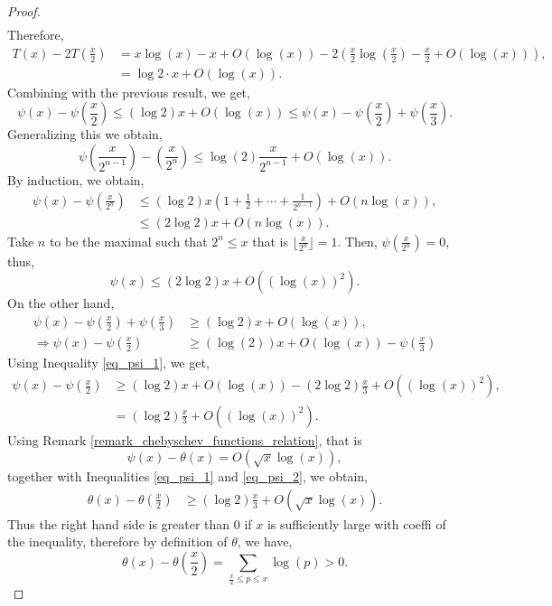 \documentclass{article}
\begin{document}
\begin{proof}
\begin{align*}
  \end{align*}
  Therefore, 
  \begin{align*}
    T(x) - 2T\left({\frac x 2}\right) & = x\log(x)-x+O(\log(x))-2\left({\frac x 2}\log\left({\frac x 2}\right)-{\frac x 2}+O(\log(x))\right),\\
    & = \log2\cdot x + O(\log(x)).
  \end{align*}
  Combining with the previous result, we get,
  \begin{equation*}
    \psi(x)-\psi\left({\frac x 2}\right)\leq (\log2)x+O(\log(x))\leq \psi(x)-\psi\left({\frac x 2}\right)+\psi\left({\frac x 3}\right).
  \end{equation*}
  Generalizing this we obtain,
  \begin{equation*}
    \psi\left({\frac x {2^{n-1}}}\right)-\left({\frac x {2^n}}\right)\leq \log(2){\frac x {2^{n-1}}}+O(\log(x)).
  \end{equation*}
  By induction, we obtain,
  \begin{align*}
    \psi(x)-\psi\left({\frac x {2^n}}\right) &\leq (\log2)x\left(1+{\frac 1 2}+\cdots+{\frac 1 {2^{n-1}}}\right)+O(n\log(x)),\\
    &\leq (2\log2)x+O(n\log(x)).\tag{$\psi1$}
    \label{eq_psi_1}
  \end{align*}
  Take $n$ to be the maximal such that $2^n\leq x$ that is $\lfloor{\frac x {2^n}}\rfloor = 1$. Then, $\psi\left({\frac x {2^n}}\right)=0$, thus,
  \begin{equation*}
    \psi(x) \leq (2\log2)x+O((\log(x))^2).
  \end{equation*}
  On the other hand,
  \begin{align*}
    \psi(x)-\psi\left({\frac x 2}\right) +\psi\left({\frac x 3}\right) &\geq (\log2)x+O(\log(x)),\\
    \Rightarrow \psi(x)-\psi\left({\frac x 2}\right) &\geq (\log(2))x+O(\log(x))-\psi\left({\frac x 3}\right) 
  \end{align*}
  Using Inequality \eqref{eq_psi_1}, we get,
  \begin{align*}
    \psi(x)-\psi\left({\frac x 2}\right) & \geq (\log2)x+O(\log(x))-(2\log2){\frac x 3}+O((\log(x))^2),\\
    & = (\log2){\frac x 3}+O((\log(x))^2).\tag{$\psi2$}\label{eq_psi_2}
  \end{align*}
  Using Remark \ref{remark_chebyschev_functions_relation}, that is 
  \begin{equation*}
    \psi(x)-\theta(x) = O(\sqrt{x}\log(x)),
  \end{equation*}
  together with Inequalities \eqref{eq_psi_1} and \eqref{eq_psi_2}, we obtain,
  \begin{align*}
    \theta(x)-\theta\left({\frac x 2}\right) &\geq (\log2){\frac x 3}+O(\sqrt{x}\log(x)).
  \end{align*}
  Thus the right hand side is greater than $0$ if $x$ is sufficiently large with coeffi of the inequality, therefore by definition of $\theta$, we have,
  \begin{equation*}
    \theta(x)-\theta\left({\frac x 2}\right) = \sum_{{\frac x 2}\leq p\leq x}\log(p)>0.
  \end{equation*}
\end{proof}
\end{document}
